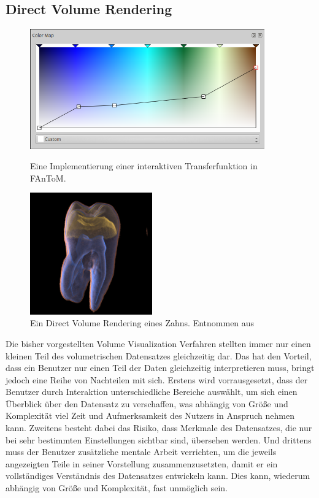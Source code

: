 \documentclass[a4paper,fontsize=12pt,toc=bib,halfparskip]{scrartcl}
\begin{document}
\subsection{Direct Volume Rendering}
\label{sec:DVR}
\begin{figure}
	\begin{minipage}{0.5\textwidth}
		\centering
		\includegraphics[width=0.9\textwidth]{pictures/Colormap.png}
		\caption{Eine Implementierung einer interaktiven Transferfunktion in FAnToM.} 
		\label{Colormap}
	\end{minipage}
	\hspace{0.5cm}
	\begin{minipage}{0.5\textwidth}
		\centering
		\includegraphics[width=0.47\textwidth]{pictures/Zahn.png}
		\caption{Ein Direct Volume Rendering eines Zahns. Entnommen aus \cite[S.~6]{drebin1988volume}}
		\label{Zahn}
	\end{minipage}
\end{figure}
Die bisher vorgestellten Volume Visualization Verfahren stellten immer nur einen kleinen Teil des volumetrischen Datensatzes gleichzeitig dar. Das hat den Vorteil, dass ein Benutzer nur einen Teil der Daten gleichzeitig interpretieren muss, bringt jedoch eine Reihe von Nachteilen mit sich. Erstens wird vorrausgesetzt, dass der Benutzer durch Interaktion unterschiedliche Bereiche ausw\"ahlt, um sich einen \"Uberblick \"uber den Datensatz zu verschaffen, was abh\"angig von Gr\"o{\ss}e und Komplexit\"at viel Zeit und Aufmerksamkeit des Nutzers in Anspruch nehmen kann. Zweitens besteht dabei das Risiko, dass Merkmale des Datensatzes, die nur bei sehr bestimmten Einstellungen sichtbar sind, \"ubersehen werden. Und drittens muss der Benutzer zus\"atzliche mentale Arbeit verrichten, um die jeweils angezeigten Teile in seiner Vorstellung zusammenzusetzten, damit er ein vollst\"andiges Verst\"andnis des Datensatzes entwickeln kann. Dies kann, wiederum abh\"angig von Gr\"o{\ss}e und Komplexit\"at, fast unm\"oglich sein.
\end{document}

